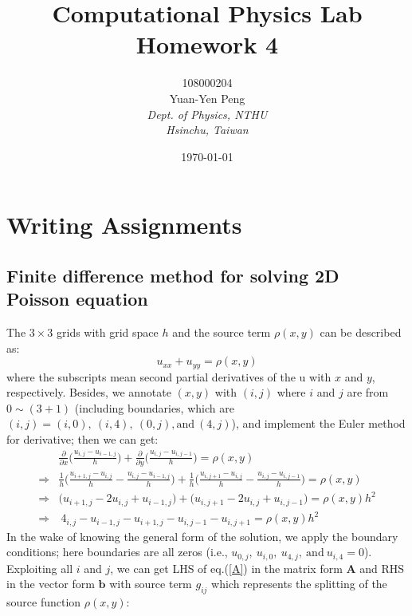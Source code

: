 \documentclass[12pt]{article}
\begin{document}
\title{\textbf{{\normalsize Computational Physics Lab}\\
                Homework 4}}
\author{108000204\\
        Yuan-Yen Peng\\
        \textit{Dept. of Physics, NTHU}\\
        \textit{Hsinchu, Taiwan}}
\date{\today}
\maketitle

\section{Writing Assignments}
    \subsection{Finite difference method for solving 2D Poisson equation}
    The $3 \times 3$ grids with grid space $h$ and the source term $\rho(x,y)$ can be described as:
    \[
        u_{xx} + u_{yy} = \rho(x,y)
    \]
    where the subscripts mean second partial derivatives of the u with $x$ and $y$, respectively. Besides, we annotate $(x,y)$ with $(i,j)$ where $i$ and $j$ are from $0 \sim (3+1)$ (including boundaries, which are $(i,j) = (i,0),\ (i,4),\ (0,j),\text{and}\ (4,j)$), and implement the Euler method for derivative; then we can get:
    \begin{align*}
        &\frac{\partial}{\partial x}\Big( \frac{u_{i,j} - u_{i-1,j}}{h} \Big) + \frac{\partial}{\partial y}\Big( \frac{u_{i,j} - u_{i,j-1}}{h} \Big) = \rho(x,y) \\
        \Rightarrow &\frac{1}{h} \Big( \frac{u_{i+1,j} - u_{i,j}}{h} - \frac{u_{i,j} - u_{i-1,j}}{h} \Big) + \frac{1}{h} \Big( \frac{u_{i,j+1} - u_{i,j}}{h} - \frac{u_{i,j} - u_{i,j-1}}{h} \Big) = \rho(x,y) \\
        \Rightarrow &\big( u_{i+1,j} - 2u_{i,j} + u_{i-1,j} \big) + \big( u_{i,j+1} - 2u_{i,j} + u_{i,j-1} \big) = \rho(x,y) h^{2} \\
        \Rightarrow&\ 4_{i,j} - u_{i-1,j} - u_{i+1,j} - u_{i,j-1} - u_{i,j+1} = \rho(x,y) h^{2} \tag{I}\label{A}
    \end{align*}
    In the wake of knowing the general form of the solution, we apply the boundary conditions; here boundaries are all zeros (i.e., $u_{0,j},\ u_{i,0},\ u_{4,j},\ \text{and}\ u_{i,4} = 0$). Exploiting all $i$ and $j$, we can get LHS of eq.(\ref{A}) in the matrix form $\mathbf{A}$ and RHS in the vector form $\mathbf{b}$ with source term $g_{ij}$ which represents the splitting of the source function $\rho(x,y)$:
\end{document}
